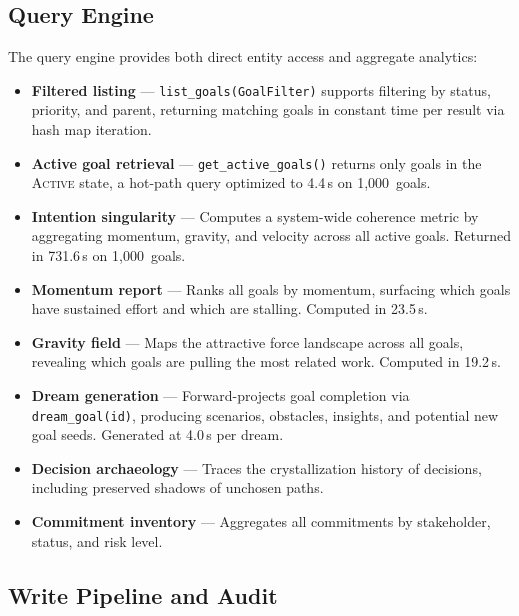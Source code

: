 \documentclass[10pt, twocolumn]{article}
\begin{document}
\subsection{Query Engine}
\label{sec:queries}

The query engine provides both direct entity access and aggregate analytics:

\begin{itemize}[nosep, leftmargin=*]
  \item \textbf{Filtered listing} --- \texttt{list\_goals(GoalFilter)} supports filtering by status, priority, and parent, returning matching goals in constant time per result via hash map iteration.
  \item \textbf{Active goal retrieval} --- \texttt{get\_active\_goals()} returns only goals in the \textsc{Active} state, a hot-path query optimized to 4.4\,\textmu s on 1{,}000~goals.
  \item \textbf{Intention singularity} --- Computes a system-wide coherence metric by aggregating momentum, gravity, and velocity across all active goals. Returned in 731.6\,\textmu s on 1{,}000~goals.
  \item \textbf{Momentum report} --- Ranks all goals by momentum, surfacing which goals have sustained effort and which are stalling. Computed in 23.5\,\textmu s.
  \item \textbf{Gravity field} --- Maps the attractive force landscape across all goals, revealing which goals are pulling the most related work. Computed in 19.2\,\textmu s.
  \item \textbf{Dream generation} --- Forward-projects goal completion via \texttt{dream\_goal(id)}, producing scenarios, obstacles, insights, and potential new goal seeds. Generated at 4.0\,\textmu s per dream.
  \item \textbf{Decision archaeology} --- Traces the crystallization history of decisions, including preserved shadows of unchosen paths.
  \item \textbf{Commitment inventory} --- Aggregates all commitments by stakeholder, status, and risk level.
\end{itemize}

\subsection{Write Pipeline and Audit}
\label{sec:writes}
\end{document}
